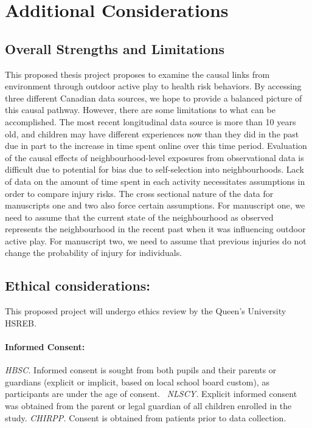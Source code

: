\documentclass [11pt]{article}
\begin{document}
\section{Additional Considerations}

\subsection{Overall Strengths and Limitations}

This proposed thesis project proposes to examine the causal links from environment through outdoor active play to health risk behaviors. By accessing three different Canadian data sources, we hope to provide a balanced picture of this causal pathway. However, there are some limitations to what can be accomplished. The most recent longitudinal data source is more than 10 years old, and children may have different experiences now than they did in the past due in part to the increase in time spent online over this time period. Evaluation of the causal effects of neighbourhood-level exposures from observational data is difficult due to potential for bias due to self-selection into neighbourhoods. Lack of data on the amount of time spent in each activity necessitates assumptions in order to compare injury risks. The cross sectional nature of the data for manuscripts one and two also force certain assumptions. For manuscript one, we need to assume that the current state of the neighbourhood as observed represents the neighbourhood in the recent past when it was influencing outdoor active play. For manuscript two, we need to assume that previous injuries do not change the probability of injury for individuals. 

\subsection{Ethical considerations:} This proposed project will undergo ethics review by the Queen's University HSREB.  

\paragraph{Informed Consent:} \emph{HBSC.} Informed consent is sought from both pupils and their parents or guardians (explicit or implicit, based on local school board custom), as participants are under the age of consent.~\cite{noauthor_undated-do} \emph{NLSCY.} Explicit informed consent was obtained from the parent or legal guardian of all children enrolled in the study. \emph{CHIRPP.} Consent is obtained from patients prior to data collection. 
\end{document}
